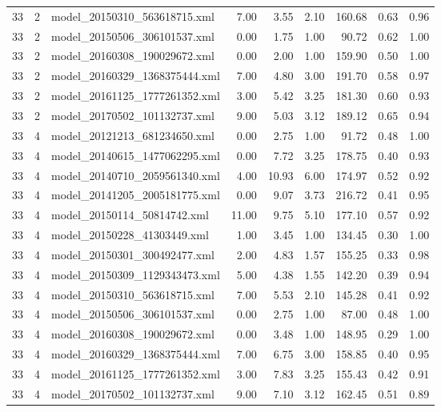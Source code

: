 \begin{table}[ht]
\begin{tabular}{rrlrrrrrr}
   33 &   2 & model\_20150310\_563618715.xml & 7.00 & 3.55 & 2.10 & 160.68 & 0.63 & 0.96 \\ 
   33 &   2 & model\_20150506\_306101537.xml & 0.00 & 1.75 & 1.00 & 90.72 & 0.62 & 1.00 \\ 
   33 &   2 & model\_20160308\_190029672.xml & 0.00 & 2.00 & 1.00 & 159.90 & 0.50 & 1.00 \\ 
   33 &   2 & model\_20160329\_1368375444.xml & 7.00 & 4.80 & 3.00 & 191.70 & 0.58 & 0.97 \\ 
   33 &   2 & model\_20161125\_1777261352.xml & 3.00 & 5.42 & 3.25 & 181.30 & 0.60 & 0.93 \\ 
   33 &   2 & model\_20170502\_101132737.xml & 9.00 & 5.03 & 3.12 & 189.12 & 0.65 & 0.94 \\ 
   33 &   4 & model\_20121213\_681234650.xml & 0.00 & 2.75 & 1.00 & 91.72 & 0.48 & 1.00 \\ 
   33 &   4 & model\_20140615\_1477062295.xml & 0.00 & 7.72 & 3.25 & 178.75 & 0.40 & 0.93 \\ 
   33 &   4 & model\_20140710\_2059561340.xml & 4.00 & 10.93 & 6.00 & 174.97 & 0.52 & 0.92 \\ 
   33 &   4 & model\_20141205\_2005181775.xml & 0.00 & 9.07 & 3.73 & 216.72 & 0.41 & 0.95 \\ 
   33 &   4 & model\_20150114\_50814742.xml & 11.00 & 9.75 & 5.10 & 177.10 & 0.57 & 0.92 \\ 
   33 &   4 & model\_20150228\_41303449.xml & 1.00 & 3.45 & 1.00 & 134.45 & 0.30 & 1.00 \\ 
   33 &   4 & model\_20150301\_300492477.xml & 2.00 & 4.83 & 1.57 & 155.25 & 0.33 & 0.98 \\ 
   33 &   4 & model\_20150309\_1129343473.xml & 5.00 & 4.38 & 1.55 & 142.20 & 0.39 & 0.94 \\ 
   33 &   4 & model\_20150310\_563618715.xml & 7.00 & 5.53 & 2.10 & 145.28 & 0.41 & 0.92 \\ 
   33 &   4 & model\_20150506\_306101537.xml & 0.00 & 2.75 & 1.00 & 87.00 & 0.48 & 1.00 \\ 
   33 &   4 & model\_20160308\_190029672.xml & 0.00 & 3.48 & 1.00 & 148.95 & 0.29 & 1.00 \\ 
   33 &   4 & model\_20160329\_1368375444.xml & 7.00 & 6.75 & 3.00 & 158.85 & 0.40 & 0.95 \\ 
   33 &   4 & model\_20161125\_1777261352.xml & 3.00 & 7.83 & 3.25 & 155.43 & 0.42 & 0.91 \\ 
   33 &   4 & model\_20170502\_101132737.xml & 9.00 & 7.10 & 3.12 & 162.45 & 0.51 & 0.89 \\ 

\end{tabular}
\end{table}
